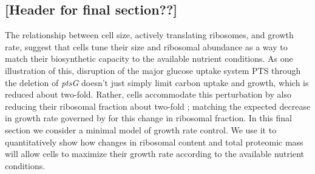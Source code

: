 



\subsection{[Header for final section??]}

The relationship between cell size, actively translating ribosomes, and growth
rate, suggest that cells tune their size and ribosomal abundance
as a way to match their biosynthetic capacity to the available nutrient
conditions. As one illustration of this, disruption of the major glucose uptake
system PTS through the deletion of \textit{ptsG} doesn't just simply limit
carbon uptake and growth, which is reduced about two-fold. Rather, cells
accommodate this perturbation by also reducing their ribosomal fraction about
two-fold \citep{dai2016}; matching the expected decrease in growth rate governed
by  for this change in ribosomal fraction. In
this final section we consider a minimal model of growth rate control. We use it
to quantitatively show how changes in ribosomal content and total proteomic mass
will allow cells to maximize their growth rate according to the available
nutrient conditions.

